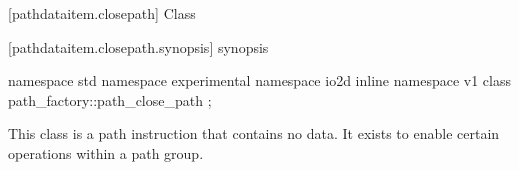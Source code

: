 [pathdataitem.closepath] {Class }

%
%
%
 [pathdataitem.closepath.synopsis] { synopsis}

\begin{codeblock}
namespace std { namespace experimental { namespace io2d { inline namespace v1 {
  class path_factory::path_close_path {
  };
} } } }
\end{codeblock}

\enternote
This class is a path instruction that contains no data. It exists to enable certain operations within a path group.
\exitnote
